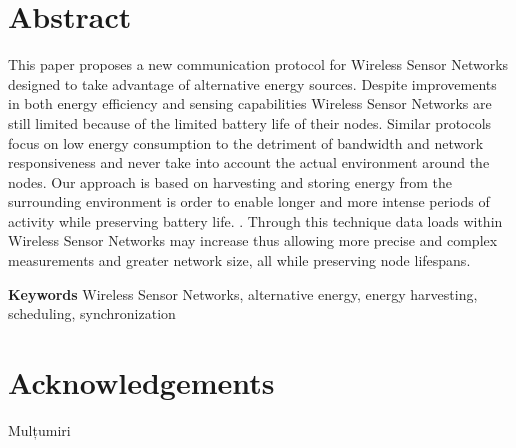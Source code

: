 \chapter*{Abstract}

This paper proposes a new communication protocol for Wireless Sensor Networks
designed to take advantage of alternative energy sources. Despite improvements
in both energy efficiency and sensing capabilities Wireless Sensor Networks are
still limited because of the limited battery life of their nodes. Similar 
protocols focus on low energy consumption to the detriment of bandwidth and network
responsiveness and never take into account the actual environment around the
nodes. Our approach is based on harvesting and storing energy
from the surrounding environment is order to enable longer and more
intense periods of activity while preserving battery life. . Through this
technique data loads within Wireless Sensor Networks may increase thus allowing
more precise and complex measurements and greater network size, all while
preserving node lifespans.

\vspace{\baselineskip}
\textbf{Keywords} Wireless Sensor Networks, alternative energy, energy
harvesting, scheduling, synchronization

\chapter*{Acknowledgements}

Mulțumiri 




